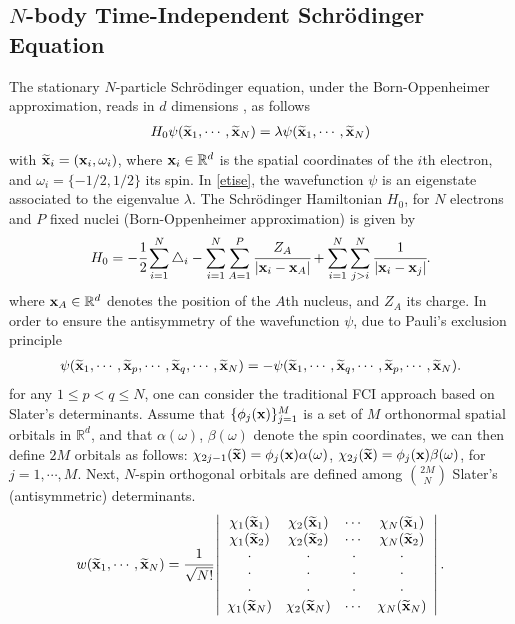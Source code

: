 \documentclass[11pt]{elsarticle}
\let \leq \leqslant
\newcommand{\R} {\ensuremath{\mathbb{R}}}
\begin{document}
\subsection{$N$-body Time-Independent Schr\"odinger Equation}\label{TISE}
The stationary $N$-particle Schr\"odinger equation, under the Born-Oppenheimer approximation, reads in $d$ dimensions \cite{CAM15-10,ostlund}, as follows
\begin{eqnarray}\label{etise}
H_0\psi(\widetilde{{\bf x}}_1,\cdots,\widetilde{{\bf x}}_N) = \lambda \psi(\widetilde{{\bf x}}_1,\cdots,\widetilde{{\bf x}}_N)
\end{eqnarray}
with $\widetilde{{\bf x}}_i=({\bf x}_i,\omega_i)$,  where ${\bf x}_i \in \R^d$ is the spatial coordinates of the $i$th electron, and $\omega_i = \{-1/2,1/2\}$ its spin. In \eqref{etise}, the wavefunction $\psi$ is an eigenstate associated to the eigenvalue $\lambda.$ The Schr\"odinger Hamiltonian $H_0$, for $N$ electrons and $P$ fixed nuclei (Born-Oppenheimer approximation) is given by
\begin{eqnarray*}
H_0 = -\cfrac{1}{2}\sum_{i=1}^N\triangle_i -\sum_{i=1}^N\sum_{A=1}^P\cfrac{Z_A}{|{\bf x}_i-{\bf x}_A|} + \sum_{i=1}^N\sum_{j>i}^N\cfrac{1}{|{\bf x}_i-{\bf x}_j|}.
\end{eqnarray*}
where ${\bf x}_A \in \R^d$ denotes the position of the $A$th nucleus, and $Z_A$ its charge. In order to ensure the antisymmetry of the wavefunction $\psi$, due to Pauli's exclusion principle
\begin{eqnarray*}
\psi(\widetilde{{\bf x}}_1,\cdots,\widetilde{{\bf x}}_p,\cdots,\widetilde{{\bf x}}_q,\cdots,\widetilde{{\bf x}}_N) = -\psi(\widetilde{{\bf x}}_1,\cdots,\widetilde{{\bf x}}_q,\cdots,\widetilde{{\bf x}}_p,\cdots,\widetilde{{\bf x}}_N).
\end{eqnarray*}
for any $1\leq p < q \leq N$, one can consider the traditional FCI approach \cite{ostlund} based on Slater's determinants. Assume that $\{\phi_j({\bf x})\}_{j=1}^M$ is a set of $M$ orthonormal spatial orbitals in $\R^d$, and that $\alpha(\omega)$, $\beta(\omega)$ denote the spin coordinates, we can then define $2M$ orbitals as follows: $\chi_{2j-1}(\widetilde{{\bf x}}) = \phi_j({\bf x})\alpha(\omega)$, $\chi_{2j}(\widetilde{{\bf x}}) = \phi_j({\bf x})\beta(\omega)$, for $j=1,\cdots,M$. Next, $N$-spin orthogonal orbitals are defined among ${2M \choose N}$ Slater's (antisymmetric) determinants.
\begin{eqnarray*}
w(\widetilde{{\bf x}}_1,\cdots,\widetilde{{\bf x}}_N) = 
\cfrac{1}{\sqrt{N!}}\left|
\begin{array}{cccc}
\chi_1(\widetilde{{\bf x}}_1) & \chi_2(\widetilde{{\bf x}}_1) & \cdots & \chi_N(\widetilde{{\bf x}}_1) \\
\chi_1(\widetilde{{\bf x}}_2) & \chi_2(\widetilde{{\bf x}}_2) & \cdots & \chi_N(\widetilde{{\bf x}}_2) \\
\cdot & \cdot & \cdot & \cdot \\
\cdot & \cdot & \cdot & \cdot \\
\cdot & \cdot & \cdot & \cdot \\
\chi_1(\widetilde{{\bf x}}_N) & \chi_2(\widetilde{{\bf x}}_N) & \cdots & \chi_N(\widetilde{{\bf x}}_N)
\end{array}
\right|.
\end{eqnarray*}
\end{document}
